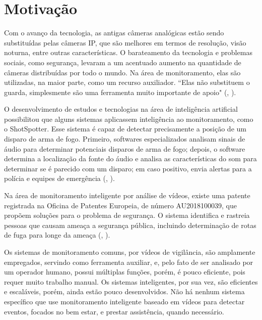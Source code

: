 \documentclass[]{politex}
\begin{document}
\section{Motivação}
Com o avanço da tecnologia, as antigas câmeras analógicas estão sendo substituídas pelas câmeras IP, que são melhores em termos de resolução, visão noturna, entre outras características. O barateamento da tecnologia e problemas sociais, como segurança, levaram a um acentuado aumento na quantidade de câmeras distribuídas por todo o mundo. Na área de monitoramento, elas são utilizadas, na maior parte, como um recurso auxiliador.  “Elas não substituem o guarda, simplesmente são uma ferramenta muito importante de apoio" (, \citeyear{bermudez}).

O desenvolvimento de estudos e tecnologias na área de inteligência artificial possibilitou que alguns sistemas aplicassem inteligência ao monitoramento, como o ShotSpotter. Esse sistema é capaz de detectar precisamente a posição de um disparo de arma de fogo. Primeiro, softwares especializados analisam sinais de áudio para determinar potenciais disparos de arma de fogo; depois, o software determina a localização da fonte do áudio e analisa as características do som para determinar se é parecido com um disparo; em caso positivo, envia alertas para a polícia e equipes de emergência (, \citeyear{shotspooter}).

Na área de monitoramento inteligente por análise de vídeos, existe uma patente registrada na Oficina de Patentes Europeia, de número AU2018100039, que propõem soluções para o problema de segurança. O sistema identifica e rastreia pessoas que causam ameaça a segurança pública, incluindo determinação de rotas de fuga para longe da ameaça (, \citeyear{patente}).

Os sistemas de monitoramento comuns, por vídeos de vigilância, são amplamente empregados, servindo como ferramenta auxiliar, e, pelo fato de ser analisado por um operador humano, possui múltiplas funções, porém, é pouco eficiente, pois requer muito trabalho manual. Os sistemas inteligentes, por sua vez, são eficientes e escaláveis, porém, ainda estão pouco desenvolvidos. Não há nenhum sistema específico que use monitoramento inteligente baseado em vídeos para detectar eventos, focados no bem estar, e prestar assistência, quando necessário.
\end{document}
